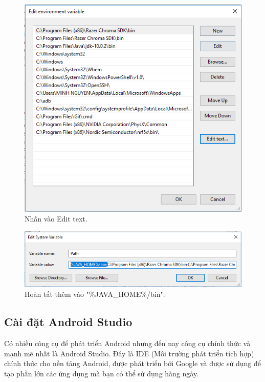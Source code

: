 \begin{enumerate}
\begin{center}
\begin{figure}[htp]
\begin{center}
     \includegraphics[scale=0.5]{image3/edittext}
    \end{center}
    \caption{Nhấn vào Edit text.}
    \label{refhinh1}
    \end{figure}
\end{center}
\begin{center}
    \begin{figure}[htp]
    \begin{center}
     \includegraphics[scale=0.5]{image3/javaedit}
    \end{center}
    \caption{Hoàn tất thêm vào "\%JAVA\_HOME\%/bin".}
    \label{refhinh1}
    \end{figure}
\end{center}
 \end{enumerate}
 \subsection{Cài đặt Android Studio}
 Có nhiều công cụ để phát triển Android nhưng đến nay công cụ chính thức và mạnh mẽ nhất là Android Studio. Đây là IDE (Môi trường phát triển tích hợp) chính thức cho nền tảng Android, được phát triển bởi Google và được sử dụng để tạo phần lớn các ứng dụng mà bạn có thể sử dụng hàng ngày.
 
